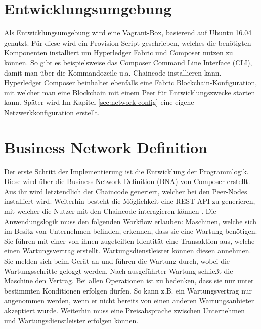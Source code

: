 \section{Entwicklungsumgebung}
Als Entwicklungsumgebung wird eine Vagrant-Box, basierend auf Ubuntu 16.04 genutzt. Für diese wird ein Provision-Script geschrieben, welches die benötigten Komponenten installiert um Hyperledger Fabric und Composer nutzen zu können. So gibt es beispielsweise das Composer Command Line Interface (CLI), damit man über die Kommandozeile u.a. Chaincode installieren kann. Hyperledger Composer beinhaltet ebenfalls eine Fabric Blockchain-Konfiguration, mit welcher man eine Blockchain mit einem Peer für Entwicklungszwecke starten kann. Später wird Im Kapitel \ref{sec:network-config} eine eigene Netzwerkkonfiguration erstellt. 

\section{Business Network Definition}
Der erste Schritt der Implementierung ist die Entwicklung der Programmlogik. Diese wird über die Business Network Definition (BNA) von Composer erstellt. Aus ihr wird letztendlich der Chaincode generiert, welcher bei den Peer-Nodes installiert wird. Weiterhin besteht die Möglichkeit eine REST-API zu generieren, mit welcher die Nutzer mit den Chaincode interagieren können \cite{DeveloperTutorialHyperledger}. Die Anwendungslogik muss den folgenden Workflow erlauben: Maschinen, welche sich im Besitz von Unternehmen befinden, erkennen, dass sie eine Wartung benötigen. Sie führen mit einer von ihnen zugeteilten Identität eine Transaktion aus, welche einen Wartungsvertrag erstellt. Wartungsdienstleister können diesen annehmen. Sie melden sich beim Gerät an und führen die Wartung durch, wobei die Wartungsschritte geloggt werden. Nach ausgeführter Wartung schließt die Maschine den Vertrag. Bei allen Operationen ist zu bedenken, dass sie nur unter bestimmten Konditionen erfolgen dürfen. So kann z.B. ein Wartungsvertrag nur angenommen werden, wenn er nicht bereits von einen anderen Wartungsanbieter akzeptiert wurde. Weiterhin muss eine Preisabsprache zwischen Unternehmen und Wartungsdienstleister erfolgen können. 

